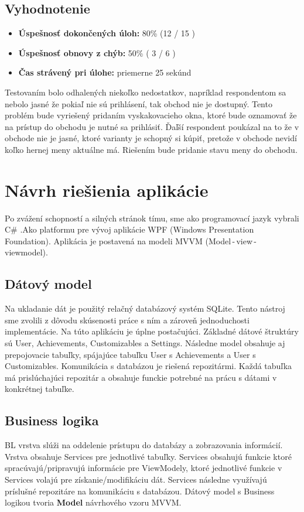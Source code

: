 \documentclass[a4paper, 11pt, onecolumn]{article}
\begin{document}
\subsection*{Vyhodnotenie}
\begin{itemize}
    \item \textbf{Úspešnosť dokončených úloh:} 80\% (12 / 15 )
    \item \textbf{Úspešnosť obnovy z chýb:} 50\% ( 3 / 6 )
    \item \textbf{Čas strávený pri úlohe:} priemerne 25 sekúnd 
\end{itemize}
Testovaním bolo odhalených niekoľko nedostatkov, napríklad respondentom sa nebolo jasné že pokiaľ nie sú prihlásení, tak 
obchod nie je dostupný. Tento problém bude vyriešený pridaním vyskakovacieho okna, ktoré bude oznamovať že na prístup do obchodu je nutné sa prihlásiť. 
Ďaľší respondent poukázal na to že v obchode nie je jasné, ktoré varianty je schopný si kúpiť, pretože v obchode nevidí koľko hernej meny aktuálne má.
Riešením bude pridanie stavu meny do obchodu.

\section{Návrh riešienia aplikácie}
Po zvážení schopností a silných stránok tímu, sme ako programovací jazyk vybrali C\# .Ako platformu pre vývoj aplikácie WPF (Windows Presentation Foundation).
Aplikácia je postavená na modeli MVVM (Model\,-\,view\,-\,viewmodel).

\subsection*{Dátový model}
Na ukladanie dát je použitý relačný databázový systém SQLite. Tento nástroj sme zvolili z dôvodu skúsenosti práce s ním a zároveň jednoduchosti implementácie.
Na túto aplikáciu je úplne postačujúci.
Základné dátové štruktúry sú User, Achievements, Customizables a Settings. Následne model obsahuje aj prepojovacie tabuľky, spájajúce tabuľku User s Achievements a User s Customizables.
Komunikácia s databázou je riešená repozitármi. Každá tabuľka má prislúchajúci repozitár a obsahuje funckie potrebné na prácu s dátami v konkrétnej tabuľke.

\subsection*{Business logika}
BL vrstva slúži na oddelenie prístupu do databázy a zobrazovania informácií. Vrstva obsahuje Services pre jednotlivé tabuľky. Services obsahujú funkcie ktoré spracúvajú/pripravujú informácie pre ViewModely,
ktoré jednotlivé funkcie v Services volajú  pre získanie/modifikáciu dát. Services následne využívajú príslušné repozitáre na komunikáciu s databázou.
Dátový model s Business logikou tvoria \textbf{Model} návrhového vzoru MVVM.

\subsection*{}
\end{document}
